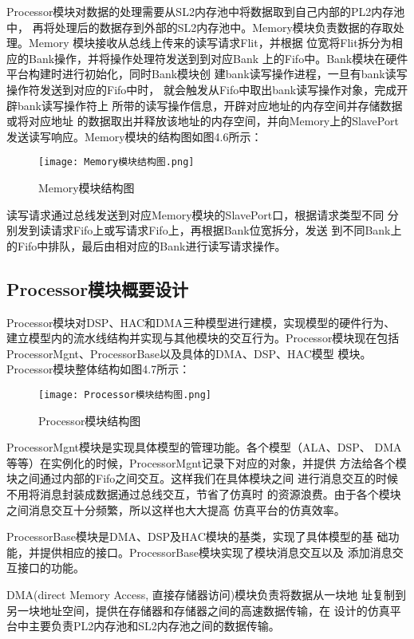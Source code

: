 Processor模块对数据的处理需要从SL2内存池中将数据取到自己内部的PL2内存池中，
再将处理后的数据存到外部的SL2内存池中。Memory模块负责数据的存取处理。Memory
模块接收从总线上传来的读写请求Flit，并根据
位宽将Flit拆分为相应的Bank操作，并将操作处理符发送到到对应Bank
上的Fifo中。Bank模块在硬件平台构建时进行初始化，同时Bank模块创
建bank读写操作进程，一旦有bank读写操作符发送到对应的Fifo中时，
就会触发从Fifo中取出bank读写操作对象，完成开辟bank读写操作符上
所带的读写操作信息，开辟对应地址的内存空间并存储数据或将对应地址
的数据取出并释放该地址的内存空间，并向Memory上的SlavePort
发送读写响应。Memory模块的结构图如图4.6所示：
\\

\begin{figure}[h]
    \centering
    \texttt{[image: Memory模块结构图.png]}
    \caption{Memory模块结构图}
    \label{fig:badge}
\end{figure}

读写请求通过总线发送到对应Memory模块的SlavePort口，根据请求类型不同
分别发到读请求Fifo上或写请求Fifo上，再根据Bank位宽拆分，发送
到不同Bank上的Fifo中排队，最后由相对应的Bank进行读写请求操作。

\subsection{Processor模块概要设计}
Processor模块对DSP、HAC和DMA三种模型进行建模，实现模型的硬件行为、
建立模型内的流水线结构并实现与其他模块的交互行为\cite{33}。Processor模块现在包括
ProcessorMgnt、ProcessorBase以及具体的DMA、DSP、HAC模型
模块。Processor模块整体结构如图4.7所示：
\begin{figure}[htb]
    \centering
    \texttt{[image: Processor模块结构图.png]}
    \caption{Processor模块结构图}
    \label{fig:badge}
\end{figure}

ProcessorMgnt模块是实现具体模型的管理功能。各个模型（ALA、DSP、
DMA等等）在实例化的时候，ProcessorMgnt记录下对应的对象，并提供
方法给各个模块之间通过内部的Fifo之间交互。这样我们在具体模块之间
进行消息交互的时候不用将消息封装成数据通过总线交互，节省了仿真时
的资源浪费。由于各个模块之间消息交互十分频繁，所以这样也大大提高
仿真平台的仿真效率。

ProcessorBase模块是DMA、DSP及HAC模块的基类，实现了具体模型的基
础功能，并提供相应的接口。ProcessorBase模块实现了模块消息交互以及
添加消息交互接口的功能。

DMA(direct Memory Access, 直接存储器访问)模块负责将数据从一块地
址复制到另一块地址空间，提供在存储器和存储器之间的高速数据传输，在
设计的仿真平台中主要负责PL2内存池和SL2内存池之间的数据传输。

